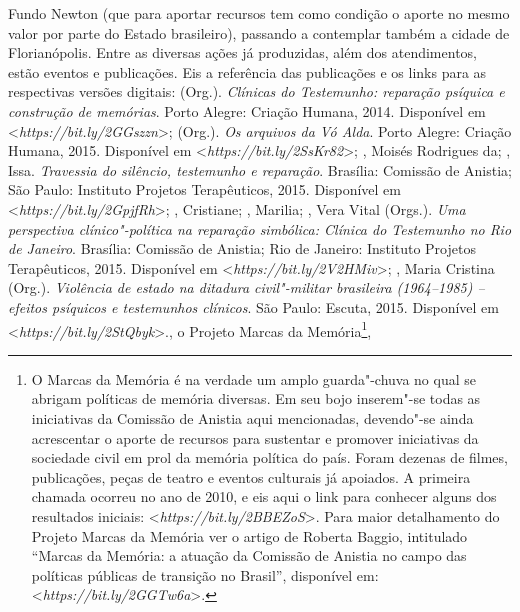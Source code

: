 {  Fundo Newton (que para aportar recursos tem como condição o aporte no
  mesmo valor por parte do Estado brasileiro), passando a contemplar
  também a cidade de Florianópolis. Entre as diversas ações já
  produzidas, além dos atendimentos, estão eventos e publicações. Eis a
  referência das publicações e os links para as respectivas versões
  digitais:  (Org.).
  \emph{Clínicas do Testemunho: reparação psíquica e construção de
  memórias}. Porto Alegre: Criação Humana, 2014. Disponível em
  \textless{}\emph{https://bit.ly/2GGszzn}\textgreater{};
   (Org.). \emph{Os
  arquivos da Vó Alda}. Porto Alegre: Criação Humana, 2015. Disponível
  em \textless{}\emph{https://bit.ly/2SsKr82}\textgreater{}; , Moisés
  Rodrigues da; , Issa. \emph{Travessia do silêncio,
  testemunho e reparação}. Brasília: Comissão de Anistia; São Paulo:
  Instituto Projetos Terapêuticos, 2015. Disponível em
  \textless{}\emph{https://bit.ly/2GpjfRh}\textgreater{};
  , Cristiane; ,
  Marilia; , Vera Vital (Orgs.). \emph{Uma perspectiva
  clínico"-política na reparação simbólica: Clínica do Testemunho no Rio
  de Janeiro}. Brasília: Comissão de Anistia; Rio de Janeiro: Instituto
  Projetos Terapêuticos, 2015. Disponível em
  \textless{}\emph{https://bit.ly/2V2HMiv}\textgreater{};
  , Maria Cristina (Org.).
  \emph{Violência de estado na ditadura civil"-militar brasileira
  (1964--1985) -- efeitos psíquicos e testemunhos clínicos}. São Paulo:
  Escuta, 2015. Disponível em \textless{}\emph{https://bit.ly/2StQbyk}\textgreater{}.},
  o Projeto Marcas da Memória\footnote{O
  Marcas da Memória é na verdade um amplo guarda"-chuva no qual se
  abrigam políticas de memória diversas. Em seu bojo inserem"-se todas as
  iniciativas da Comissão de Anistia aqui mencionadas, devendo"-se ainda
  acrescentar o aporte de recursos para sustentar e promover iniciativas
  da sociedade civil em prol da memória política do país. Foram dezenas
  de filmes, publicações, peças de teatro e eventos culturais já
  apoiados. A primeira chamada ocorreu no ano de 2010, e eis aqui o
  link para conhecer alguns dos resultados iniciais:
  \textless{}\emph{https://bit.ly/2BBEZoS}\textgreater{}.
  Para maior detalhamento do Projeto Marcas da Memória ver o artigo de
  Roberta Baggio, intitulado ``Marcas da Memória: a atuação da Comissão
      de Anistia no campo das políticas públicas de transição no Brasil'',
  disponível em: \textless{}\emph{https://bit.ly/2GGTw6a}\textgreater{}.},

